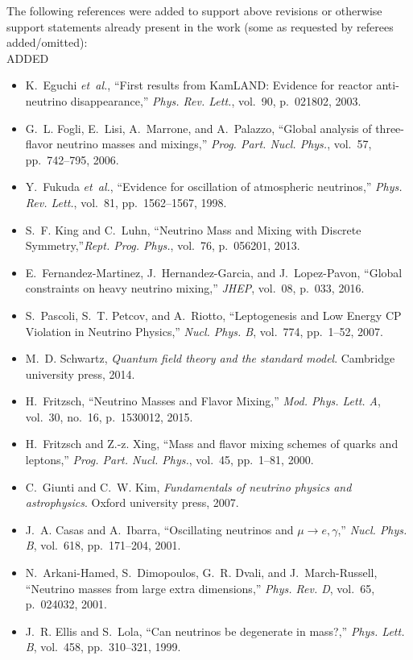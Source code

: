 \documentclass[a4paper, 10pt]{letter}
\begin{document}
\begin{letter}
The following references were added to support above revisions or otherwise support statements already present in the work (some as requested by referees added/omitted):\\
ADDED
\begin{itemize}
    \item K.~Eguchi {\em et~al.}, ``{First results from KamLAND: Evidence for reactor anti-neutrino disappearance},'' {\em Phys. Rev. Lett.}, vol.~90, p.~021802, 2003.
    \item G.~L. Fogli, E.~Lisi, A.~Marrone, and A.~Palazzo, ``{Global analysis of three-flavor neutrino masses and mixings},'' {\em Prog. Part. Nucl. Phys.}, vol.~57, pp.~742--795, 2006.
    \item Y.~Fukuda {\em et~al.}, ``{Evidence for oscillation of atmospheric neutrinos},'' {\em Phys. Rev. Lett.}, vol.~81, pp.~1562--1567, 1998.
    \item S.~F. King and C.~Luhn, ``{Neutrino Mass and Mixing with Discrete Symmetry},''{\em Rept. Prog. Phys.}, vol.~76, p.~056201, 2013.
    \item E.~Fernandez-Martinez, J.~Hernandez-Garcia, and J.~Lopez-Pavon, ``{Global constraints on heavy neutrino mixing},'' {\em JHEP}, vol.~08, p.~033, 2016.
    \item S.~Pascoli, S.~T. Petcov, and A.~Riotto, ``{Leptogenesis and Low Energy CP Violation in Neutrino Physics},'' {\em Nucl. Phys. B}, vol.~774, pp.~1--52, 2007.
    \item M.~D. Schwartz, {\em Quantum field theory and the standard model}. Cambridge university press, 2014.
    \item H.~Fritzsch, ``{Neutrino Masses and Flavor Mixing},'' {\em Mod. Phys. Lett. A}, vol.~30, no.~16, p.~1530012, 2015.
    \item H.~Fritzsch and Z.-z. Xing, ``{Mass and flavor mixing schemes of quarks and leptons},'' {\em Prog. Part. Nucl. Phys.}, vol.~45, pp.~1--81, 2000.
    \item C.~Giunti and C.~W. Kim, {\em Fundamentals of neutrino physics and astrophysics}. Oxford university press, 2007.
    \item J.~A. Casas and A.~Ibarra, ``{Oscillating neutrinos and $\mu \to e, \gamma$},'' {\em Nucl. Phys. B}, vol.~618, pp.~171--204, 2001.
    \item N.~Arkani-Hamed, S.~Dimopoulos, G.~R. Dvali, and J.~March-Russell, ``{Neutrino masses from large extra dimensions},'' {\em Phys. Rev. D}, vol.~65, p.~024032, 2001.    
    \item J.~R. Ellis and S.~Lola, ``{Can neutrinos be degenerate in mass?},'' {\em Phys. Lett. B}, vol.~458, pp.~310--321, 1999.

\end{itemize}
\end{letter}
\end{document}
